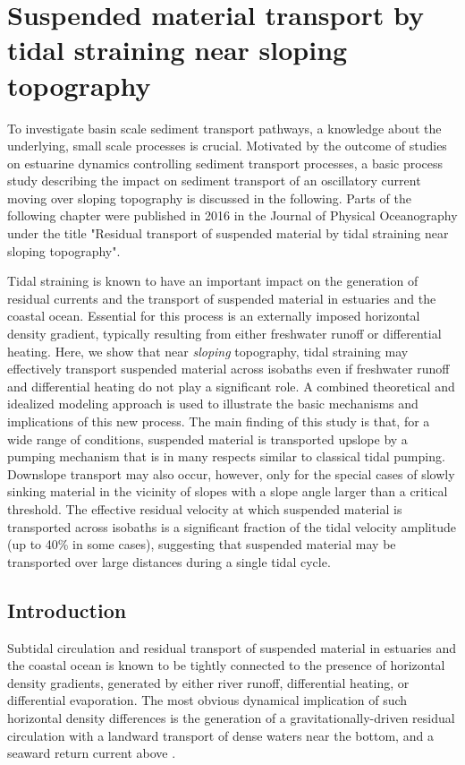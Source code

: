 \chapter{Suspended material transport by tidal straining
  near sloping topography}
\label{kap-slope}

To investigate basin scale sediment transport pathways, a knowledge 
about the underlying, small scale processes is crucial. Motivated by the 
outcome of studies on estuarine dynamics controlling sediment transport 
processes, a basic process study describing the impact on sediment transport of 
an oscillatory current moving over sloping topography is discussed in the 
following. Parts of the following chapter were published in 2016 in the Journal 
of Physical Oceanography under the title "Residual transport of suspended 
material by tidal straining near sloping topography".

Tidal straining is known to have an important impact on the
  generation of residual currents and the transport of suspended
  material in estuaries and the coastal ocean. Essential for this
  process is an externally imposed horizontal density gradient,
  typically resulting from either freshwater runoff or differential
  heating. Here, we show that near \emph{sloping} topography, tidal
  straining may effectively transport suspended material across
  isobaths even if freshwater runoff and differential heating do not
  play a significant role. A combined theoretical and idealized
  modeling approach is used to illustrate the basic mechanisms and
  implications of this new process. The main finding of this study is
  that, for a wide range of conditions, suspended material is
  transported upslope by a pumping mechanism that is in many respects
  similar to classical tidal pumping. Downslope transport may also
  occur, however, only for the special cases of slowly sinking
  material in the vicinity of slopes with a slope angle larger than a
  critical threshold. The effective residual velocity at which
  suspended material is transported across isobaths is a significant
  fraction of the tidal velocity amplitude (up to 40\% in some cases),
  suggesting that suspended material may be transported over large
  distances during a single tidal cycle. \citep{schulzumlauf2016}

\section{Introduction\label{sec:intro}}
Subtidal circulation and residual transport of suspended material in
estuaries and the coastal ocean is known to be tightly connected to
the presence of horizontal density gradients, generated by either
river runoff, differential heating, or differential evaporation. The
most obvious dynamical implication of such horizontal density
differences is the generation of a gravitationally-driven residual
circulation with a landward transport of dense waters near the bottom,
and a seaward return current above
\citep{Pritchard1952,MacCreadyGeyer2010}.


